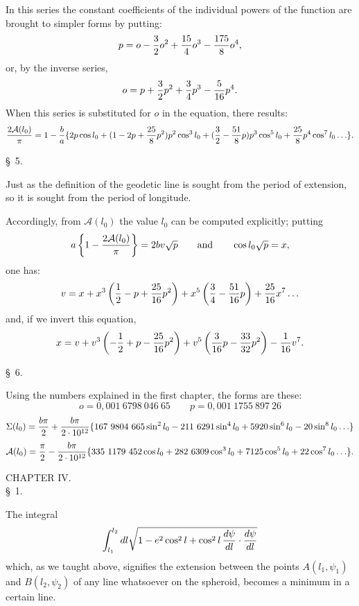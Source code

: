In this series the constant coefficients of the individual powers of the function  are brought to simpler forms by putting:
\[
 p=o-{3\over2}o^2+{15\over4}o^3-{175\over8}o^4,
\]
or, by the inverse series,
\[
 o=p+{3\over2}p^2+{3\over4}p^3-{5\over16}p^4.
\]
When this series is substituted for $o$ in the equation, there results:
\[
 {2\mathcal A(l_0)\over\pi}=1-{b\over a}\{2p\cos l_0+(1-2p+{25\over8}p^2)p^2\cos^3l_0+({3\over2}-{51\over8}p)p^3\cos^5l_0+{25\over8}p^4\cos^7l_0\ldots\}.
\]

\begin{center}\S\ 5.\end{center}

Just as the definition of the geodetic line is sought from the period of extension, so it is sought from the period of longitude.

Accordingly, from $\mathcal A(l_0)$ the value $l_0$ can be computed explicitly; putting
\[
 a\left\{1-{2\mathcal A(l_0)\over\pi}\right\}=2bv\sqrt p\qquad \text{and}\qquad \cos l_0\sqrt p=x,
\]
one has:
\[
 v=x+x^3\left({1\over2}-p+{25\over16}p^2\right)+x^5\left({3\over4}-{51\over16}p\right)+{25\over16}x^7\ldots
\]
and, if we invert this equation,
\[
 x=v+v^3\left(-{1\over2}+p-{25\over16}p^2\right)+v^5\left({3\over16}p-{33\over32}p^2\right)-{1\over16}v^7.
\]

\begin{center}\S\ 6.\end{center}

Using the numbers explained in the first chapter, the forms are these:
\[
 o=0{,}001\ 6798\ 046\ 65\qquad p=0{,}001\ 1755\ 897\ 26
\]
\[
 \Sigma(l_0)={b\pi\over2}+{b\pi\over2\cdot10^{12}}\{167\ 9804\ 665\sin^2l_0-211\ 6291\sin^4l_0+5920\sin^6l_0-20\sin^8l_0\ldots\}
\]
\[
 \mathcal A(l_0)={\pi\over2}-{b\pi\over2\cdot10^{12}}\{335\ 1179\ 452\cos l_0+282\ 6309\cos^3l_0+7125\cos^5l_0+22\cos^7l_0\ldots\}.
\]

\begin{center}
{\large CHAPTER IV.}\\[0.8em]
\S\ 1.
\end{center}

The integral
\[
 \int_{l_1}^{l_2}dl\sqrt{1-e^2\cos^2l+\cos^2l\,{d\psi\over dl}\cdot{d\psi\over dl}}
\]
which, as we taught above, signifies the extension between the points $A(l_1,\psi_1)$ and $B(l_2,\psi_2)$ of any line whatsoever on the spheroid, becomes a minimum in a certain line.
